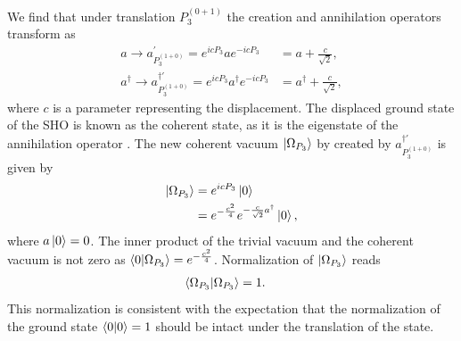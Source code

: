 \documentclass[%
 reprint,
superscriptaddress,
 amsmath,amssymb,
 aps,
]{revtex4-2}
\begin{document}
We find that under translation $P^{(0+1)}_{3}$ the creation and annihilation operators transform as
\begin{align}
    a \rightarrow a^{\prime}_{P^{(1+0)}_{3}}=e^{ic P_{3}}ae^{-ic P_{3}}&=a +\frac{c}{\sqrt{2}},\\
    a^{\dagger} \rightarrow a^{\dagger\prime}_{P^{(1+0)}_{3}}=e^{ic P_{3}}a^{\dagger}e^{-ic P_{3}}&=a^{\dagger} + \frac{c}{\sqrt{2}},
\end{align}
where $c$ is a parameter representing the displacement. The displaced ground state of the SHO is known as the coherent state, as it is the eigenstate of the annihilation operator \cite{Glauber1963}. The new coherent vacuum $\ket{\Omega_{P_{3}}}$ by created by $a^{\dagger\prime}_{P^{(1+0)}_{3}}$ is given by
\begin{align}
    \ket{\Omega_{P_{3}}}&=e^{ic P_{3}}\ket{0}\\
    &=e^{-\frac{c^2}{4}}e^{-\frac{c}{\sqrt{2}}a^{\dagger}}\ket{0},
\end{align}
where $a\ket{0}=0$. The inner product of the trivial vacuum and the coherent vacuum is not zero as $\braket{0|\Omega_{P_{3}}} = 
e^{-\frac{c^2}{4}}$. Normalization of $\ket{\Omega_{P_{3}}}$ reads 
\begin{align}
\braket{\Omega_{P_{3}}|\Omega_{P_{3}}} &=1.
\end{align}
This normalization is consistent with the expectation that the normalization of the ground state $\braket{0|0} =1$ should be intact under the translation of the state.
\end{document}
